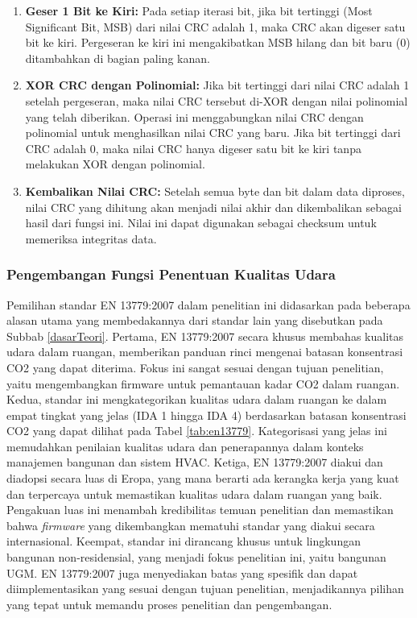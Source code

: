 \begin{enumerate}
            \item \textbf{Geser 1 Bit ke Kiri:} 
            Pada setiap iterasi bit, jika bit tertinggi (Most Significant Bit, MSB) dari nilai CRC adalah 1, maka CRC akan digeser satu bit ke kiri. Pergeseran ke kiri ini mengakibatkan MSB hilang dan bit baru (0) ditambahkan di bagian paling kanan. 
        
            \item \textbf{XOR CRC dengan Polinomial:} 
            Jika bit tertinggi dari nilai CRC adalah 1 setelah pergeseran, maka nilai CRC tersebut di-XOR dengan nilai polinomial yang telah diberikan. Operasi ini menggabungkan nilai CRC dengan polinomial untuk menghasilkan nilai CRC yang baru. Jika bit tertinggi dari CRC adalah 0, maka nilai CRC hanya digeser satu bit ke kiri tanpa melakukan XOR dengan polinomial.
        
            \item \textbf{Kembalikan Nilai CRC:} 
            Setelah semua byte dan bit dalam data diproses, nilai CRC yang dihitung akan menjadi nilai akhir dan dikembalikan sebagai hasil dari fungsi ini. Nilai ini dapat digunakan sebagai checksum untuk memeriksa integritas data.
        \end{enumerate}
        
        \subsubsection{Pengembangan Fungsi Penentuan Kualitas Udara}
        Pemilihan standar EN 13779:2007 dalam penelitian ini didasarkan pada beberapa alasan utama yang membedakannya dari standar lain yang disebutkan pada Subbab \ref{dasarTeori}. Pertama, EN 13779:2007 secara khusus membahas kualitas udara dalam ruangan, memberikan panduan rinci mengenai batasan konsentrasi CO2 yang dapat diterima. Fokus ini sangat sesuai dengan tujuan penelitian, yaitu mengembangkan firmware untuk pemantauan kadar CO2 dalam ruangan. Kedua, standar ini mengkategorikan kualitas udara dalam ruangan ke dalam empat tingkat yang jelas (IDA 1 hingga IDA 4) berdasarkan batasan konsentrasi CO2 yang dapat dilihat pada Tabel \ref{tab:en13779}. Kategorisasi yang jelas ini memudahkan penilaian kualitas udara dan penerapannya dalam konteks manajemen bangunan dan sistem HVAC. Ketiga, EN 13779:2007 diakui dan diadopsi secara luas di Eropa, yang mana berarti ada kerangka kerja yang kuat dan terpercaya untuk memastikan kualitas udara dalam ruangan yang baik. Pengakuan luas ini menambah kredibilitas temuan penelitian dan memastikan bahwa\textit{ firmware} yang dikembangkan mematuhi standar yang diakui secara internasional. Keempat, standar ini dirancang khusus untuk lingkungan bangunan non-residensial, yang menjadi fokus penelitian ini, yaitu bangunan UGM. EN 13779:2007 juga menyediakan batas yang spesifik dan dapat diimplementasikan yang sesuai dengan tujuan penelitian, menjadikannya pilihan yang tepat untuk memandu proses penelitian dan pengembangan.
        
